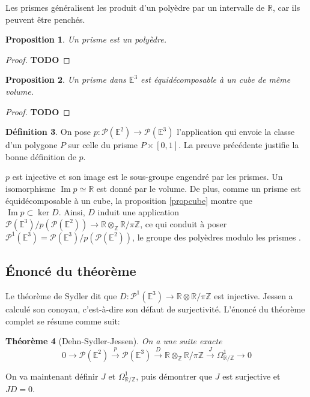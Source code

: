 \documentclass{article}
\newcommand{\Z}{\mathbb{Z}}
\newcommand{\R}{\mathbb{R}}
\newcommand{\E}{\mathbb{E}}
\renewcommand{\P}{\mathcal{P}}
\newcommand{\todo}{\textbf{TODO}}
\renewcommand{\Im}{\mathop{\mathrm{Im}}}
\theoremstyle{plain}
\newtheorem{theorem}{Théorème}
\newtheorem{proposition}[theorem]{Proposition}
\theoremstyle{definition}
\newtheorem{definition}[theorem]{Définition}
\theoremstyle{remark}
\begin{document}
Les prismes généralisent les produit d'un polyèdre par un intervalle de $\R$, car ils peuvent être penchés.

\begin{proposition}
    Un prisme est un polyèdre.
\end{proposition}

\begin{proof}
    \todo
\end{proof}

\begin{proposition}
    Un prisme dans $\E^3$ est équidécomposable à un cube de même volume.
\end{proposition}

\begin{proof}
    \todo
\end{proof}

\begin{definition}
    On pose $p : \P(\E^2) \to \P(\E^3)$ l'application qui envoie la classe d'un polygone $P$ sur celle du prisme $P\times [0,1]$. La preuve précédente justifie la bonne définition de $p$.
\end{definition} 

$p$ est injective et son image est le sous-groupe engendré par les prismes. Un isomorphisme $\Im p \simeq \R$ est donné par le volume. De plus, comme un prisme est équidécomposable à un cube, la proposition \ref{propcube} montre que $\Im p \subset \ker D$. Ainsi, $D$ induit une application $\P(\E^3)/p(\P(\E^2)) \to \R \otimes_\Z \R/\pi\Z$, ce qui conduit à poser $\P^1(\E^3) = \P(\E^3)/p(\P(\E^2))$, le groupe des \og polyèdres modulo les prismes \fg.

\subsection{Énoncé du théorème}
Le théorème de Sydler dit que $D : \P^1(\E^3) \to \R \otimes \R/\pi\Z$ est injective. Jessen a calculé son conoyau, c'est-à-dire son défaut de surjectivité. L'énoncé du théorème complet se résume comme suit:
\begin{theorem}[Dehn-Sydler-Jessen]
    On a une suite exacte
    \[0 \to \P(\E^2) \xrightarrow{p} \P(\E^3) \xrightarrow{D} \R \otimes_\Z \R/\pi\Z \xrightarrow{J} \Omega_{\R/\Z}^1 \to 0\]
\end{theorem}

On va maintenant définir $J$ et $\Omega_{\R/\Z}^1$, puis démontrer que $J$ est surjective et $JD = 0$.
\end{document}
